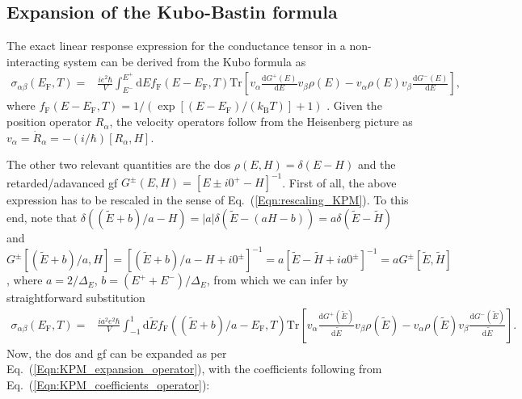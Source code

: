 \documentclass[aps,prb,amsmath,amssymb,twocolumn, superscriptaddress]{revtex4-2}
\newcommand{\eq}[1]{Eq.~(\ref{#1})}
\begin{document}
\subsection{Expansion of the Kubo-Bastin formula}
The exact linear response expression for the conductance tensor in a non-interacting system can be derived from the Kubo formula as 
\begin{align}
\sigma_{\alpha \beta}(E_\mathrm{F}, T) =& \frac{i e^2 \hbar}{V} \int_{E^-}^{E^+} \mathrm{d} E f_\mathrm{F}(E - E_\mathrm{F}, T) \mathrm{Tr} \left[v_\alpha \frac{\mathrm{d} G^+(E)}{\mathrm{d} E} v_\beta \rho(E)  - v_\alpha \rho(E) v_\beta  \frac{\mathrm{d} G^-(E)}{\mathrm{d} E} \right],\label{Eqn_App:Kubo_Bastin}
\end{align}
where $f_\mathrm{F}(E - E_\mathrm{F}, T) = 1 / (\exp[(E-E_\mathrm{F}) / (k_\mathrm{B} T)] + 1)$ \cite{Kubo_paper_App, Kubo_Bastin_App, Kubo_Bastin_modern_App}. Given the position operator $R_\alpha$, the velocity operators follow from the Heisenberg picture as $v_\alpha = \dot R_\alpha = -(i/ \hbar) [R_\alpha, H]$.

The other two relevant quantities are the \gls{dos} $\rho(E, H) = \delta(E - H)$ and the retarded/adavanced \gls{gf} $G^{\pm}(E, H) = [E \pm i 0^+ - H]^{-1}$. First of all, the above expression has to be rescaled in the sense of \eq{Eqn:rescaling_KPM}. To this end, note that $\delta((\tilde E + b) / a - H) = |a| \delta (\tilde E - (a H - b)) = a \delta (\tilde E - \tilde H)$ and $G^\pm[(\tilde E + b) / a, H] = [(\tilde E + b) / a - H + i 0^\pm]^{-1} = a  [\tilde E - \tilde H + i a 0^\pm]^{-1} = a G^\pm[\tilde E , \tilde H]$, where $a = 2/\Delta_E$, $b = (E^+ + E^-)/ \Delta_E$, from which we can infer by straightforward substitution
\begin{align}
\sigma_{\alpha \beta}(E_\mathrm{F}, T) =& \frac{i a^2 e^2 \hbar}{V} \int_{-1}^{1} \mathrm{d} \tilde E f_\mathrm{F}((\tilde E + b)/a - E_\mathrm{F}, T) \mathrm{Tr}\left[v_\alpha \frac{\mathrm{d} G^+(\tilde E)}{\mathrm{d} \tilde  E} v_\beta \rho(\tilde E) - v_\alpha \rho(\tilde  E) v_\beta \frac{\mathrm{d} G^- (\tilde E)}{\mathrm{d} \tilde E}   \right]. \label{Eqn_App:Kubo_Bastin_rescaled}
\end{align}
Now, the \gls{dos} and \gls{gf} can be expanded as per \eq{Eqn:KPM_expansion_operator}, with the coefficients following from \eq{Eqn:KPM_coefficients_operator}: 
\end{document}
